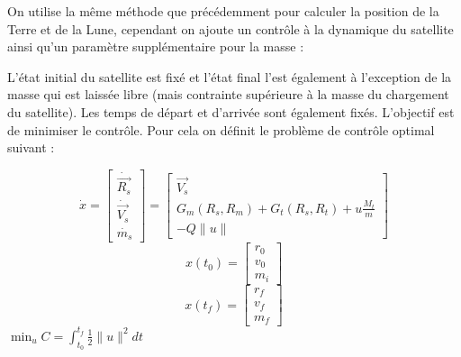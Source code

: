 \documentclass[11pt]{article} %
\begin{document}
		On utilise la même méthode que précédemment pour calculer la position de la Terre et de la Lune, cependant on ajoute un contrôle à la dynamique du satellite ainsi qu'un paramètre supplémentaire pour la masse :
		
		L'état initial du satellite est fixé et l'état final l'est également à l'exception de la masse qui est laissée libre (mais contrainte supérieure à la masse du chargement du satellite). Les temps de départ et d'arrivée sont également fixés.
		L'objectif est de minimiser le contrôle. Pour cela on définit le problème de contrôle optimal suivant :
		
		$$
		\dot{x}=
		\begin{bmatrix}
			\dot{\overrightarrow{R_{s}}}\\
			\dot{\overrightarrow{V_{s}}}\\
			\dot{m_{s}}
		\end{bmatrix} =\begin{bmatrix}
			\overrightarrow{V_{s}}\\
			G_{m}(R_s,R_m)+G_{t}(R_s,R_t)+u\frac{M_{t}}{m}\\
			-Q\|u\|
		\end{bmatrix}
		$$
		$$
			x(t_0)=\begin{bmatrix}
				r_0\\
				v_0\\
				m_i
			\end{bmatrix}
		$$
		$$
		x(t_f)=\begin{bmatrix}
			r_f\\
			v_f\\
			m_f
		\end{bmatrix}
		$$
		$\min_{u}C=\int_{t_0}^{t_f}\frac{1}{2}\|u\|^2dt$
		
\end{document}
